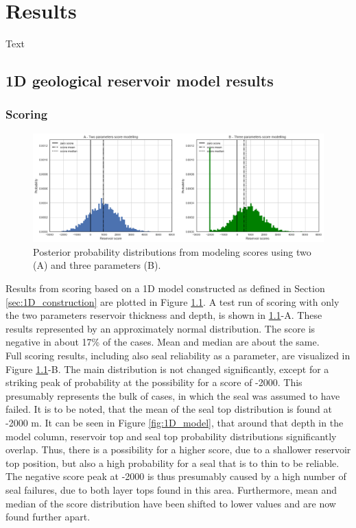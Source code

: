 	\chapter{Results}\label{cha:results}
	Text
	
		\section{1D geological reservoir model results}
	
			\subsection{Scoring}
			\begin{figure}[h]
				\centering
				\includegraphics[width=1\textwidth]{Figures/score_results1.png}
				\caption{Posterior probability distributions from modeling scores using two (A) and three parameters (B).}\label{fig:score_results1}
			\end{figure}
			Results from scoring based on a 1D model constructed as defined in Section \ref{sec:1D_construction} are plotted in Figure \ref{fig:score_results1}. A test run of scoring with only the two parameters reservoir thickness and depth, is shown in \ref{fig:score_results1}-A. These results represented by an approximately normal distribution. The score is negative in about 17\% of the cases. Mean and median are about the same.\\	
			Full scoring results, including also seal reliability as a parameter, are visualized in Figure \ref{fig:score_results1}-B. The main distribution is not changed significantly, except for a striking peak of probability at the possibility for a score of -2000. This presumably represents the bulk of cases, in which the seal was assumed to have failed. It is to be noted, that the mean of the seal top distribution is found at -2000 m. It can be seen in Figure \ref{fig:1D_model}, that around that depth in the model column, reservoir top and seal top probability distributions significantly overlap. Thus, there is a possibility for a higher score, due to a shallower reservoir top position, but also a high probability for a seal that is to thin to be reliable. The negative score peak at -2000 is thus presumably caused by a high number of seal failures, due to both layer tops found in this area. Furthermore, mean and median of the score distribution have been shifted to lower values and are now found further apart.
			
